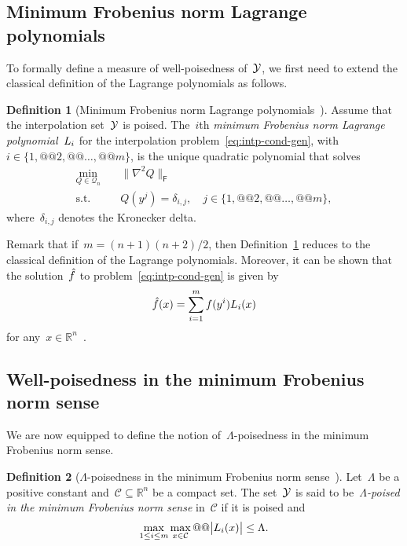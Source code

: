 \documentclass{article}
\makeatletter
\newcounter{cite}
\theoremstyle{definition}
\newtheorem{definition}{Definition}[section]
\theoremstyle{plain}
\theoremstyle{remark}
\newcommand*{\abs}[2][]{#1\lvert#2#1\rvert}
\newcommand*{\norm}[2][]{#1\lVert#2#1\rVert}
\newcommand*{\set}[2][]{#1\{#2#1\}}
\newcommand*{\obj}{f}
\newcommand*{\objm}[1][]{\hat{\obj}\ifblank{#1}{}{^{#1}}}
\newcommand*{\R}{\mathbb{R}}
\newcommand*{\lagp}[1][]{L\ifblank{#1}{}{_{#1}}}
\newcommand*{\xpt}[1][]{\mathcal{Y}\ifblank{#1}{}{^{@#1}}}
\newcommand*{\qpoly}{\mathcal{Q}_n}
\makeatother
\begin{document}
\subsection{Minimum Frobenius norm Lagrange polynomials}

To formally define a measure of well-poisedness of~$\xpt$, we first need to extend the classical definition of the Lagrange polynomials as follows.

\begin{definition}[Minimum Frobenius norm Lagrange polynomials~{\cite[Definition~5.1]{Conn_Scheinberg_Vicente_2009}}]
    \label{def:min-norm-lagp}
    Assume that the interpolation set~$\xpt$ is poised.
    The~$i$th \emph{minimum Frobenius norm Lagrange polynomial}~$\lagp[i]$ for the interpolation problem~\eqref{eq:intp-cond-gen}, with~$i \in \set{1, @@ 2, @@ \dots, @@ m}$, is the unique quadratic polynomial that solves
    \begin{equation*}
        \begin{aligned}
            \min_{Q \in \qpoly} & \quad \norm[\big]{\nabla^2 Q}_{\mathsf{F}}\\
            \text{s.t.}         & \quad Q(y^j) = \delta_{i, j}, \quad j \in \set{1, @@ 2, @@ \dots, @@ m},
        \end{aligned}
    \end{equation*}
    where~$\delta_{i, j}$ denotes the Kronecker delta.
\end{definition}

Remark that if~$m = (n + 1) (n + 2) / 2$, then Definition~\ref{def:min-norm-lagp} reduces to the classical definition of the Lagrange polynomials.
Moreover, it can be shown that the solution~$\objm$ to problem~\eqref{eq:intp-cond-gen} is given by
\begin{equation*}
    \objm(x) = \sum_{i = 1}^m \obj(y^i) \lagp[i](x)
\end{equation*}
for any~$x \in \R^n$~\cite[Lemma~5.2]{Conn_Scheinberg_Vicente_2009}.

\subsection{Well-poisedness in the minimum Frobenius norm sense}

We are now equipped to define the notion of~$\Lambda$-poisedness in the minimum Frobenius norm sense.

\begin{definition}[$\Lambda$-poisedness in the minimum Frobenius norm sense~{\cite[Definition~5.6]{Conn_Scheinberg_Vicente_2009}}]
    \label{def:lambda-p}
    Let~$\Lambda$ be a positive constant and~$\mathcal{C} \subseteq \R^n$ be a compact set.
    The set~$\xpt$ is said to be~\emph{$\Lambda$-poised in the minimum Frobenius norm sense} in~$\mathcal{C}$ if it is poised and
    \begin{equation*}
        \max_{1 \le i \le m} \max_{x \in \mathcal{C}} @@ \abs[\big]{\lagp[i](x)} \le \Lambda.
    \end{equation*}
\end{definition}
\end{document}
